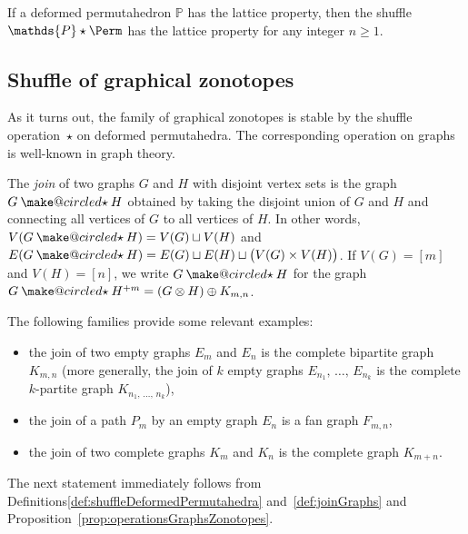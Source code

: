 \documentclass[AHL,Unicode,longabstracts,published]{cedram}
\makeatletter
\newcommand{\ostar}{\mathbin{\mathpalette\make@circled\star}}
\newcommand{\make@circled}[2]{%
  \ooalign{$\m@th#1\smallbigcirc{#1}$\cr\hidewidth$\m@th#1#2$\hidewidth\cr}%
}
\newcommand{\smallbigcirc}[1]{%
  \vcenter{\hbox{\scalebox{0.77778}{$\m@th#1\bigcirc$}}}%
}
\newcommand{\joinGraph}{\ostar} %
\newcommand{\shuffleDP}{\star} %
\newcommand{\polytope}[1]{\mathds{#1}}
\makeatother
\begin{document}
\begin{coro}\label{coro:latticeShufflePermutahedron}
If a deformed permutahedron $\polytope{P}$ has the lattice property, then the shuffle $\polytope{P} \shuffleDP \Perm$ has the lattice property for any integer $n \ge 1$.
\end{coro}



\subsection{Shuffle of graphical zonotopes}\label{subsec:shuffleGraphicalZonotopes}

As it turns out, the family of graphical zonotopes is stable by the shuffle operation~$\shuffleDP$ on deformed permutahedra. The corresponding operation on graphs is well-known in graph theory.

\begin{defi}\label{def:joinGraphs}
The
\emph{join} of two graphs $G$ and $H$ with disjoint vertex sets is the graph $G \joinGraph H$ obtained by taking the disjoint union of $G$ and $H$ and connecting all vertices of $G$ to all vertices of $H$. In other words, $V(G \joinGraph H) = V(G) \sqcup V(H)$ and $E(G \joinGraph H) = E(G) \sqcup E(H) \sqcup \big(V(G) \times V(H) \big)$. If $V(G) = [m]$ and $V(H) = [n]$, we write $G \joinGraph H$ for the graph $G \joinGraph H^{+m} = (G \otimes H) \oplus K_{m,n}$.
\end{defi}

\begin{exam}\label{exm:joinGraphs}
The following families provide some relevant examples:
\begin{itemize}
\item the join of two empty graphs $E_m$ and $E_n$ is the complete bipartite graph $K_{m,n}$ (more generally, the join of $k$ empty graphs $E_{n_1},\,\dots,\, E_{n_k}$ is the complete $k$-partite graph $K_{n_1,\, \dots,\,n_k}$),
\item the join of a path $P_m$ by an empty graph $E_n$ is a fan graph $F_{m,n}$,
\item the join of two complete graphs $K_m$ and $K_n$ is the complete graph $K_{m+n}$.
\end{itemize}
\end{exam}

The next statement immediately follows from Definitions\ref{def:shuffleDeformedPermutahedra} and~\ref{def:joinGraphs} and Proposition~\ref{prop:operationsGraphsZonotopes}.
\end{document}
